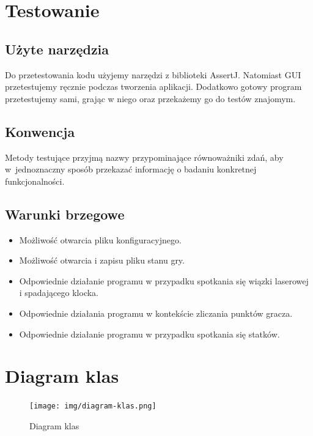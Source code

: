 \documentclass[a4paper]{article}
\begin{document}
\section{Testowanie}
\subsection{Użyte narzędzia}
Do przetestowania kodu użyjemy narzędzi z biblioteki AssertJ. Natomiast GUI przetestujemy ręcznie podczas tworzenia aplikacji. Dodatkowo gotowy program przetestujemy sami, grając w niego oraz przekażemy go do testów znajomym.

\subsection{Konwencja}
Metody testujące przyjmą nazwy przypominające równoważniki zdań, aby w~jednoznaczny sposób przekazać informację o badaniu konkretnej funkcjonalności.

\subsection{Warunki brzegowe}
\begin{itemize}
    \item Możliwość otwarcia pliku konfiguracyjnego.
    \item Możliwość otwarcia i zapisu pliku stanu gry.
    \item Odpowiednie działanie programu w przypadku spotkania się wiązki laserowej i spadającego klocka.
    \item Odpowiednie działania programu w kontekście zliczania punktów gracza.
    \item Odpowiednie działanie programu w przypadku spotkania się statków.
\end{itemize}

\section{Diagram klas}
\begin{figure}[H]
    \centering
    \texttt{[image: img/diagram-klas.png]}
    \caption{Diagram klas}
    \label{fig:diagram}
\end{figure}
\label{end}
\end{document}
